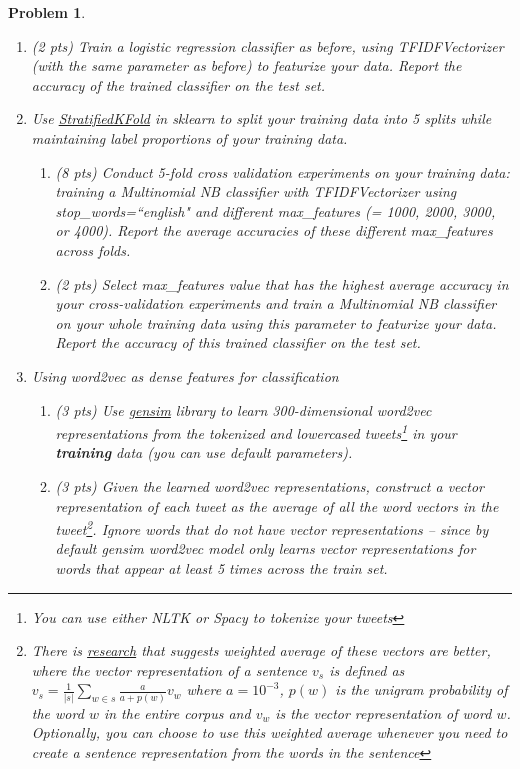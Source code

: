 \documentclass{article}
\newtheorem{problem}{Problem}
\begin{document}
\begin{problem}
\begin{enumerate}
\item (2 pts) Train a logistic regression classifier as before, using TFIDFVectorizer (with the same parameter as before) to featurize your data. Report the accuracy of the trained classifier on the test set.
\item Use \href{https://scikit-learn.org/stable/modules/generated/sklearn.model_selection.StratifiedKFold.html}{StratifiedKFold} in sklearn to split your training data into 5 splits while maintaining label proportions of your training data. 
\begin{enumerate}
    \item (8 pts) Conduct 5-fold cross validation experiments on your training data: training a Multinomial NB classifier with TFIDFVectorizer using stop\_words=``english" and different max\_features (= 1000, 2000, 3000, or 4000). Report the average accuracies of these different max\_features across folds. 
    \item (2 pts) Select max\_features value that has the highest average accuracy in your cross-validation experiments and train a Multinomial NB classifier on your whole training data using this parameter to featurize your data. Report the accuracy of this trained classifier on the test set. 
\end{enumerate}
\item Using word2vec as dense features for classification
\begin{enumerate}
    \item (3 pts) Use \href{https://radimrehurek.com/gensim/models/word2vec.html}{gensim} library to learn 300-dimensional word2vec representations from the tokenized and lowercased tweets\footnote{You can use either NLTK or Spacy to tokenize your tweets} in your \textbf{training} data (you can use default parameters). 
    \item (3 pts) Given the learned word2vec representations, construct a vector representation of each tweet as the average of all the word vectors in the tweet\footnote{\label{note1}There is \href{https://openreview.net/pdf?id=SyK00v5xx}{research} that suggests weighted average of these vectors are better, where the vector representation of a sentence $v_s$ is defined as $v_s = \frac{1}{|s|} \sum_{w \in s} \frac{a}{a+p(w)} v_w$ where $a=10^{-3}$, $p(w)$ is the unigram probability of the word $w$ in the entire corpus and $v_w$ is the vector representation of word $w$. Optionally, you can choose to use this weighted average whenever you need to create a sentence representation from the words in the sentence}. Ignore words that do not have vector representations -- since by default gensim word2vec model only learns vector representations for words that appear at least 5 times across the train set.  

\end{enumerate}
\end{enumerate}
\end{problem}
\end{document}

